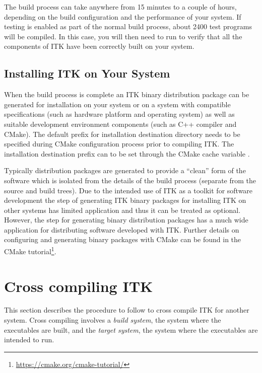 The build process can take anywhere from 15 minutes to a couple of hours,
depending on the build configuration and the performance of your
system. If testing is enabled as part of the normal build process,
about 2400 test programs will be compiled. In this case, you will then need
to run  to verify that all the components of ITK have been correctly built
on your system.

\subsection{Installing ITK on Your System}
\label{sec:Installation}


When the build process is complete an ITK binary distribution package can be
generated for installation on your system or on a system with compatible
specifications (such as hardware platform and operating system) as well as
suitable development environment components (such as C++ compiler and CMake).
The default prefix for installation destination directory needs to be specified
during CMake configuration process prior to compiling ITK. The installation
destination prefix can to be set through the CMake cache variable
.

Typically distribution packages are generated to provide a ``clean'' form of the
software which is isolated from the details of the build process (separate from
the source and build trees). Due to the intended use of ITK as a toolkit for
software development the step of generating ITK binary packages for installing
ITK on other systems has limited application and thus it can be treated as
optional. However, the step for generating binary distribution packages has a
much wide application for distributing software developed with ITK. Further
details on configuring and generating binary packages with CMake can be found in
the CMake tutorial\footnote{\url{https://cmake.org/cmake-tutorial/}}.

\section{Cross compiling ITK}
\label{sec:CrossCompilingITK}

This section describes the procedure to follow to cross compile ITK for
another system. Cross compiling involves a \textit{build system}, the system
where the executables are built, and the \textit{target system}, the system
where the executables are intended to run.

